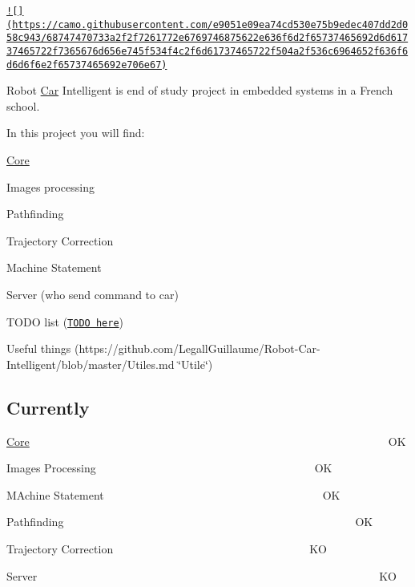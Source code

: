 \href{http://estei.fr/}{\tt !\mbox{[}\mbox{]}(https\-://camo.\-githubusercontent.\-com/e9051e09ea74cd530e75b9edec407dd2d058c943/68747470733a2f2f7261772e6769746875622e636f6d2f65737465692d6d61737465722f7365676d656e745f534f4c2f6d61737465722f504a2f536c6964652f636f6d6d6f6e2f65737465692e706e67)}

Robot \hyperlink{class_car}{Car} Intelligent is end of study project in embedded systems in a French school.

In this project you will find\-:
\begin{DoxyItemize}
\item \hyperlink{class_core}{Core}
\item Images processing
\item Pathfinding
\item Trajectory Correction
\item Machine Statement
\item Server (who send command to car)
\item T\-O\-D\-O list (\href{https://github.com/LegallGuillaume/Robot-Car-Intelligent/blob/master/TODO}{\tt T\-O\-D\-O here})
\item Useful things (https\-://github.com/\-Legall\-Guillaume/\-Robot-\/\-Car-\/\-Intelligent/blob/master/\-Utiles.\-md \char`\"{}\-Utile\char`\"{}) 


\end{DoxyItemize}

\subsection*{Currently}


\begin{DoxyItemize}
\item \hyperlink{class_core}{Core}~~~~~~~~~~~~~~~~~~~~~~~~~~~~~~~~~~~~~~~~~~~~~~~~~~~~~~~~~~~~~~~~O\-K
\item Images Processing~~~~~~~~~~~~~~~~~~~~~~~~~~~~~~~~~~~~~~~O\-K
\item M\-Achine Statement~~~~~~~~~~~~~~~~~~~~~~~~~~~~~~~~~~~~~~~O\-K
\item Pathfinding~~~~~~~~~~~~~~~~~~~~~~~~~~~~~~~~~~~~~~~~~~~~~~~~~~~~O\-K
\item Trajectory Correction~~~~~~~~~~~~~~~~~~~~~~~~~~~~~~~~~~~K\-O
\item Server~~~~~~~~~~~~~~~~~~~~~~~~~~~~~~~~~~~~~~~~~~~~~~~~~~~~~~~~~~~~~K\-O
\end{DoxyItemize}





